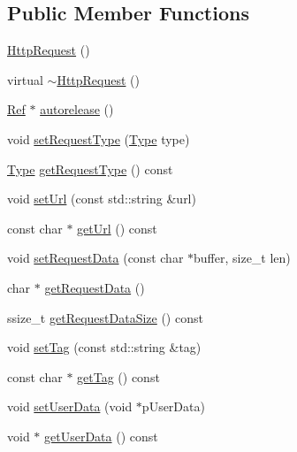 \subsection*{Public Member Functions}
\begin{DoxyCompactItemize}
\item 
\hyperlink{classnetwork_1_1HttpRequest_ae2e924419ee17ce1bbc87f0122688bb4}{Http\+Request} ()
\item 
virtual \hyperlink{classnetwork_1_1HttpRequest_aeb9ba7fdc3fef6237d611fc9af752bad}{$\sim$\+Http\+Request} ()
\item 
\hyperlink{classRef}{Ref} $\ast$ \hyperlink{classnetwork_1_1HttpRequest_a0fc06041ec6a34d4f92c786a99a91a33}{autorelease} ()
\item 
void \hyperlink{classnetwork_1_1HttpRequest_a07865a1628998a33a57e38cfe254e4cc}{set\+Request\+Type} (\hyperlink{classnetwork_1_1HttpRequest_abcc6d7ee2ea91a721d32fd6d396743fe}{Type} type)
\item 
\hyperlink{classnetwork_1_1HttpRequest_abcc6d7ee2ea91a721d32fd6d396743fe}{Type} \hyperlink{classnetwork_1_1HttpRequest_ad9faf7f8b3f7a86a94f650271eea5442}{get\+Request\+Type} () const
\item 
void \hyperlink{classnetwork_1_1HttpRequest_a2f7663791f980b15c90c34acf281fe4a}{set\+Url} (const std\+::string \&url)
\item 
const char $\ast$ \hyperlink{classnetwork_1_1HttpRequest_a9379bae7239cf005675dfbec1db0134f}{get\+Url} () const
\item 
void \hyperlink{classnetwork_1_1HttpRequest_a819fd1cea3e4772de3ab45c6135c29e5}{set\+Request\+Data} (const char $\ast$buffer, size\+\_\+t len)
\item 
char $\ast$ \hyperlink{classnetwork_1_1HttpRequest_a13f6e9e055afd00d0f5ff3be2d791858}{get\+Request\+Data} ()
\item 
ssize\+\_\+t \hyperlink{classnetwork_1_1HttpRequest_a3e78c2a4f271bb2e5fb8f30e965d319f}{get\+Request\+Data\+Size} () const
\item 
void \hyperlink{classnetwork_1_1HttpRequest_a0e4f8ff5b153e624857183be498ef33d}{set\+Tag} (const std\+::string \&tag)
\item 
const char $\ast$ \hyperlink{classnetwork_1_1HttpRequest_a6f8026156353b462ecfa2884e0b83421}{get\+Tag} () const
\item 
void \hyperlink{classnetwork_1_1HttpRequest_a7afec412b6f1fb5ab420212f7889313d}{set\+User\+Data} (void $\ast$p\+User\+Data)
\item 
void $\ast$ \hyperlink{classnetwork_1_1HttpRequest_a54c3f127831cbe5ad995396a100972d6}{get\+User\+Data} () const

\end{DoxyCompactItemize}
